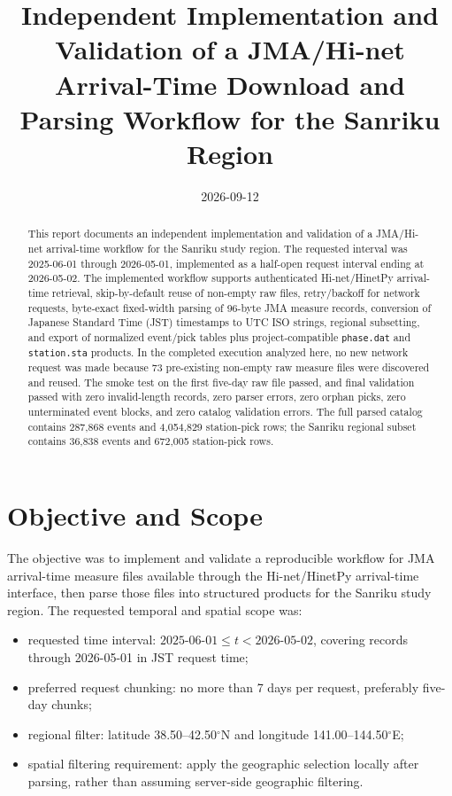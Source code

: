 \documentclass[11pt]{article}
\title{Independent Implementation and Validation of a JMA/Hi-net Arrival-Time Download and Parsing Workflow for the Sanriku Region}
\author{\traceauthor}
\date{2026-09-12}
\begin{document}
\maketitle

\begin{abstract}
This report documents an independent implementation and validation of a JMA/Hi-net arrival-time workflow for the Sanriku study region.  The requested interval was 2025-06-01 through 2026-05-01, implemented as a half-open request interval ending at 2026-05-02.  The implemented workflow supports authenticated Hi-net/HinetPy arrival-time retrieval, skip-by-default reuse of non-empty raw files, retry/backoff for network requests, byte-exact fixed-width parsing of 96-byte JMA measure records, conversion of Japanese Standard Time (JST) timestamps to UTC ISO strings, regional subsetting, and export of normalized event/pick tables plus project-compatible \texttt{phase.dat} and \texttt{station.sta} products.  In the completed execution analyzed here, no new network request was made because 73 pre-existing non-empty raw measure files were discovered and reused.  The smoke test on the first five-day raw file passed, and final validation passed with zero invalid-length records, zero parser errors, zero orphan picks, zero unterminated event blocks, and zero catalog validation errors.  The full parsed catalog contains 287,868 events and 4,054,829 station-pick rows; the Sanriku regional subset contains 36,838 events and 672,005 station-pick rows.
\end{abstract}

\section{Objective and Scope}

The objective was to implement and validate a reproducible workflow for JMA arrival-time measure files available through the Hi-net/HinetPy arrival-time interface, then parse those files into structured products for the Sanriku study region.  The requested temporal and spatial scope was:
\begin{itemize}
  \item requested time interval: \(2025\text{-}06\text{-}01 \leq t < 2026\text{-}05\text{-}02\), covering records through 2026-05-01 in JST request time;
  \item preferred request chunking: no more than 7 days per request, preferably five-day chunks;
  \item regional filter: latitude 38.50--42.50\(^{\circ}\)N and longitude 141.00--144.50\(^{\circ}\)E;
  \item spatial filtering requirement: apply the geographic selection locally after parsing, rather than assuming server-side geographic filtering.
\end{itemize}
\end{document}
